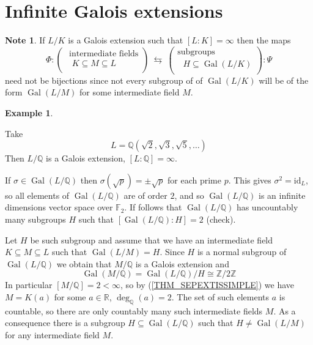 \documentclass[12pt, letterpaper, oneside]{article}
\theoremstyle{plain}
\theoremstyle{definition}
\newtheorem{example}[theorem]{Example}
\newtheorem{note}[theorem]{Note}
\newcommand{\Z}{{\mathbb Z}}
\newcommand{\Q}{{\mathbb Q}}
\newcommand{\R}{{\mathbb R}}
\newcommand{\F}{{\mathbb F}}
\newcommand{\id}{\mathrm{id}}
\newcommand{\Gal}{\operatorname{Gal}}
\newcommand{\vs}{\vskip 5mm}
\begin{document}




\newpage
\section{Infinite Galois extensions}
\label{SEC_INFINITEGALEXT}


\begin{note}
If $L/K$ is a Galois extension such that $[L:K]=\infty$ then the maps 
$$
\Phi\colon 
\begin{pmatrix}
\text{ intermediate fields} \\[1mm]
\text{  $K\subseteq M \subseteq L$} \\
\end{pmatrix}
\ \leftrightarrows \ 
\begin{pmatrix}
\text{subgroups} \\[1mm]
\text{ $H\subseteq \Gal(L/K)$} \\
\end{pmatrix}
\colon \Psi
$$
need not be bijections since not every subgroup of of $\Gal(L/K)$ will be of the form 
$\Gal(L/M)$ for some intermediate field $M$.  
\end{note}

\vs\vs

\begin{example} \ 

Take 
$$L = \Q(\sqrt{2}, \sqrt{3}, \sqrt{5}, \dots )$$
Then $L/\Q$ is a Galois extension, $[L:\Q] = \infty$. 

If $\sigma\in \Gal(L/\Q)$ then $\sigma(\sqrt{p}) = \pm \sqrt{p}$ for each prime $p$. This gives 
$\sigma^{2} = \id_{L}$, so all elements of $\Gal(L/\Q)$ are of order $2$, and so $\Gal(L/\Q)$
is an infinite dimensions vector space over $\F_{2}$. If follows that $\Gal(L/\Q)$ has uncountably
many subgroups $H$ such that $[\Gal(L/\Q) : H] = 2$ (check).  

Let  $H$ be such subgroup and assume that we have an intermediate field 
$K\subseteq M \subseteq L$ such that $\Gal(L/M) =H$. Since $H$ is a normal subgroup of 
$\Gal(L/\Q)$ we obtain that $M/\Q$ is a Galois extension and 
$$\Gal(M/\Q) = \Gal(L/\Q)/H \cong \Z/2\Z$$
In particular $[M/\Q] = 2 <\infty $, so by  (\ref{THM_SEPEXTISSIMPLE}) we have 
$M = K(a)$ for some $a \in \R$, $\deg_{\Q}(a) =2$. The set of such elements $a$
is countable, so  there are only countably many such intermediate fields $M$. As a consequence 
there is a subgroup  $H\subseteq \Gal(L/\Q)$ such that $H\neq \Gal(L/M)$ for any intermediate 
field $M$.


\end{example}
\end{document}
